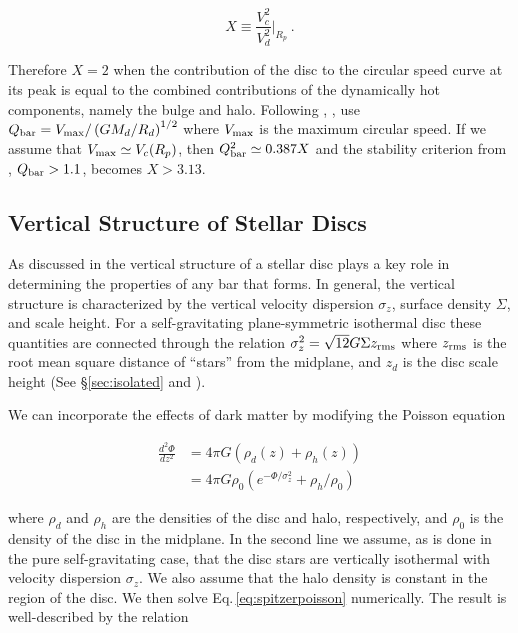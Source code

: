\begin{equation} \label{eq:x}
X \equiv  \frac{V_c^2}{V_d^2}\Biggr\rvert_{R_p}~.
\end{equation}

\noindent Therefore $X=2$ when the contribution of the disc to the
circular speed curve at its peak is equal to the combined
contributions of the dynamically hot components, namely the bulge and
halo.  Following \citet{EfstathiouShotNoise},
\citet{YurinSpringelStellarDisks}, use $Q_{\rm bar} = V_{\rm
  max}/\left (GM_d/R_d\right )^{1/2}$ where $V_{\rm max}$ is the
maximum circular speed.  If we assume that $V_{\rm max}\simeq
V_c(R_p)$, then $Q_{\rm bar}^2 \simeq 0.387 X$ and the stability
criterion from \citet{EfstathiouShotNoise}, $Q_{\rm bar}>1.1$, becomes
$X > 3.13$.

\subsection{Vertical Structure of Stellar Discs}

As discussed in \citet{Klypin2009} the vertical structure of a stellar
disc plays a key role in determining the properties of any bar that
forms.  In general, the vertical structure is characterized by the
vertical velocity dispersion $\sigma_z$, surface density $\Sigma$, and
scale height.  For a self-gravitating plane-symmetric isothermal disc
these quantities are connected through the relation $\sigma_z^2 =
\sqrt{12}G\Sigma z_{\rm rms}$ where $z_{\rm rms}$ is the root mean square distance
of ``stars'' from the midplane, and $z_d$ is the disc scale height (See
\S\ref{sec:isolated} and 
\citet{spitzer1942, camm1950}).

We can incorporate the effects of dark matter by modifying
the Poisson equation

\begin{equation} \label{eq:spitzerpoisson}
\begin{aligned}
\frac{d^2\Phi}{dz^2} & = 4\pi G \left (\rho_d(z) + \rho_h(z) \right )\\
& = 4\pi G\rho_0 \left(e^{-\Phi/\sigma_z^2} + \rho_h/\rho_0\right )
\end{aligned}
\end{equation}

\noindent where $\rho_d$ and $\rho_h$ are the densities of the disc
and halo, respectively, and $\rho_0$ is the density of the disc in the
midplane.  In the second line we assume, as is done in the pure
self-gravitating case, that the disc stars are vertically isothermal
with velocity dispersion $\sigma_z$.  We also assume that the halo
density is constant in the region of the disc.  We then solve
Eq.\,\ref{eq:spitzerpoisson} numerically.  The result is
well-described by the relation


